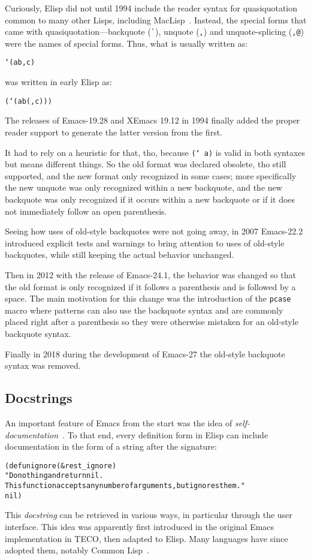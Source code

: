 \documentclass[format=acmsmall, review=false, screen=true]{acmart}
\newcommand \Elisp {Elisp}
\begin{document}
Curiously, \Elisp{} did not until 1994 include the reader syntax for
quasiquotation common to many other Lisps, including MacLisp~\cite{Bawden1999}.
Instead, the special forms that came with quasiquotation---backquote
(\verb|`|), unquote (\verb|,|) and unquote-splicing (\verb|,@|) were
the names of special forms.   Thus, what is usually written as:
%
\begin{alltt}
`(a b ,c)
\end{alltt}
%
was written in early \Elisp{} as:
%
\begin{alltt}
(` (a b (, c)))
\end{alltt}
%
The releases of Emacs-19.28 and XEmacs 19.12 in 1994 finally added the
proper reader support to generate the latter version from the first.

It had to rely on a heuristic for that, tho, because \texttt{(` a)} is valid
in both syntaxes but means different things.  So the old format was declared
obsolete, tho still supported, and the new format only recognized in some
cases; more specifically the new unquote was only recognized within a new
backquote, and the new backquote was only recognized if it occurs within
a new backquote or if it does not immediately follow an open parenthesis.

Seeing how uses of old-style backquotes were not going away, in 2007
Emacs-22.2 introduced explicit tests and warnings to bring attention to uses
of old-style backquotes, while still keeping the actual behavior unchanged.

Then in 2012 with the release of Emacs-24.1, the behavior was changed so
that the old format is only recognized if it follows a parenthesis and is
followed by a space.  The main motivation for this change was the
introduction of the \texttt{pcase} macro where patterns can also use the
backquote syntax and are commonly placed right after a parenthesis so they
were otherwise mistaken for an old-style backquote syntax.

Finally in 2018 during the development of Emacs-27 the
old-style backquote syntax was removed.

\subsection{Docstrings}
\label{sec:docstrings}

An important feature of Emacs from the start was the idea of
\emph{self-documentation}~\cite{Stallman1981}.  To that end, every
definition form in \Elisp{} can include documentation in the form of a
string after the signature:
%
\begin{alltt}
(defun ignore (&rest _ignore)
  "Do nothing and return nil.
This function accepts any number of arguments, but ignores them."
  nil)
\end{alltt}
%
This \emph{docstring} can be retrieved in various ways, in particular
through the user interface.  This idea was apparently first introduced in
the original Emacs implementation in TECO, then adapted to \Elisp{}.
Many languages have since adopted them, notably Common
Lisp~\cite{HyperSpec}.
\end{document}
